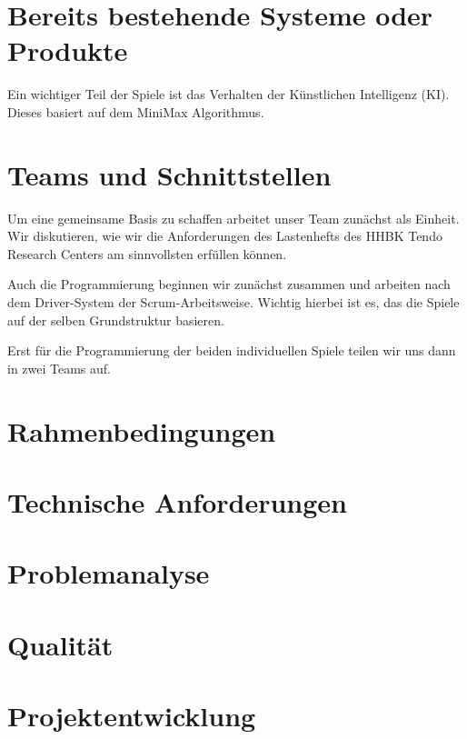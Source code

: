 \documentclass[14pt]{scrartcl}
\begin{document}
\section{Bereits bestehende Systeme oder Produkte}


Ein wichtiger Teil der Spiele ist das Verhalten der Künstlichen Intelligenz (KI). Dieses basiert auf dem MiniMax Algorithmus.

\section{Teams und Schnittstellen}

Um eine gemeinsame Basis zu schaffen arbeitet unser Team zunächst als Einheit. Wir diskutieren, wie wir die Anforderungen des Lastenhefts des HHBK Tendo Research Centers am sinnvollsten erfüllen können. \par 

Auch die Programmierung beginnen wir zunächst zusammen und arbeiten nach dem Driver-System der Scrum-Arbeitsweise. 
Wichtig hierbei ist es, das die Spiele auf der selben Grundstruktur basieren. \par

Erst für die Programmierung der beiden individuellen Spiele teilen wir uns dann in zwei Teams auf. \par 

\section{Rahmenbedingungen}

\section{Technische Anforderungen}

\section{Problemanalyse}

\section{Qualität}

\section{Projektentwicklung}

		
\end{document}

